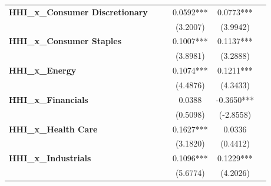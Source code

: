 \begin{center}
\begin{tabular}{lccccc}
\textbf{HHI\_x\_Consumer Discretionary}       &                       &                        &       0.0592***        &         0.0773***          &                            \\
\textbf{ }                                    &                       &                        &        (3.2007)        &          (3.9942)          &                            \\
\textbf{HHI\_x\_Consumer Staples}             &                       &                        &       0.1007***        &         0.1137***          &                            \\
\textbf{ }                                    &                       &                        &        (3.8981)        &          (3.2888)          &                            \\
\textbf{HHI\_x\_Energy}                       &                       &                        &       0.1074***        &         0.1211***          &                            \\
\textbf{ }                                    &                       &                        &        (4.4876)        &          (4.3433)          &                            \\
\textbf{HHI\_x\_Financials}                   &                       &                        &         0.0388         &         -0.3650***         &                            \\
\textbf{ }                                    &                       &                        &        (0.5098)        &         (-2.8558)          &                            \\
\textbf{HHI\_x\_Health Care}                  &                       &                        &       0.1627***        &           0.0336           &                            \\
\textbf{ }                                    &                       &                        &        (3.1820)        &          (0.4412)          &                            \\
\textbf{HHI\_x\_Industrials}                  &                       &                        &       0.1096***        &         0.1229***          &                            \\
\textbf{ }                                    &                       &                        &        (5.6774)        &          (4.2026)          &                            \\

\end{tabular}
\end{center}
